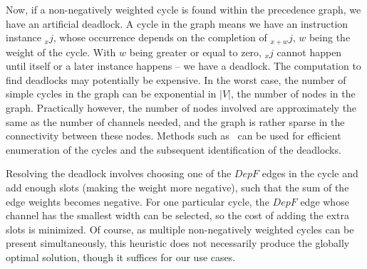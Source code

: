 Now, if a non-negatively weighted cycle is found within the precedence graph, we have an artificial deadlock.
A cycle in the graph means we have an instruction instance $_xj$, whose occurrence depends on the completion of $_{x+w}j$, $w$ being the weight of the cycle.
With $w$ being greater or equal to zero, $_xj$ cannot happen until itself or a later instance happens -- we have a deadlock. 
The computation to find deadlocks may potentially be expensive. In the worst case, the number
of simple cycles in the graph can be exponential in
$|V|$, the number of nodes in the graph. Practically however, the number of
nodes involved are approximately the same as the number of channels needed, and the graph is rather sparse in the connectivity between these nodes. 
Methods such as~\cite{doi:10.1137/0204007} can be used for efficient
enumeration of the cycles and the subsequent identification of the deadlocks.



Resolving
the deadlock involves choosing one of the $DepF$ edges
in the cycle and add enough slots (making the weight more negative),
such that the sum of the edge weights becomes negative. For
one particular cycle, the $DepF$ edge whose channel has the smallest width can be selected, so the cost of adding the extra slots is minimized. Of course,
as multiple non-negatively weighted cycles can be present simultaneously,
this heuristic does not necessarily produce the globally optimal solution, though it suffices
for our use cases.


